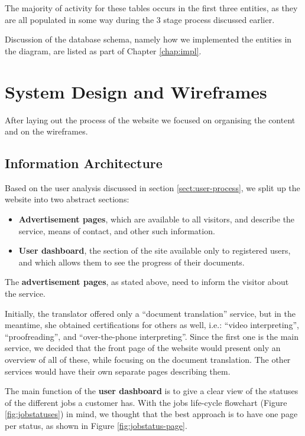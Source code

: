 \documentclass{l3proj}
\begin{document}
The majority of activity for these tables occurs in the first three entities, as
they are all populated 
in some way during the 3 stage process discussed earlier.

Discussion of the database schema, namely how we implemented the entities in the
diagram, are listed as part of Chapter \ref{chap:impl}.


\section{System Design and Wireframes}
\label{sect:system-design-and-wireframes}
After laying out the process of the website we focused on organising the content
and on the wireframes.


\subsection{Information Architecture}
Based on the user analysis discussed in section \ref{sect:user-process}, we split
up the website into two abstract sections: 
\begin{itemize} 
	\item \textbf{Advertisement pages}, which are available to all visitors, and
	describe the service, means of contact, and other such information.
	\item \textbf{User dashboard}, the section of the site available only to
	registered users, and which allows them to see the progress of their 
	documents.
\end{itemize}

The \textbf{advertisement pages}, as stated above, need to inform the visitor
about the service. 

Initially, the translator offered only a ``document translation'' service, but
in the meantime, she obtained certifications for others as well, i.e.:
``video interpreting'', ``proofreading'', and ``over-the-phone interpreting''.
Since the first one is the main service, we decided that the front page of the
website would present only an overview of all of these, while focusing on the
document translation. The other services would have their own separate pages
describing them.

The main function of the \textbf{user dashboard} is to give a clear view of
the statuses of the different jobs a customer has. With the jobs life-cycle
flowchart (Figure \ref{fig:jobstatuses}) in mind, we thought that the best
approach is to have one page per status, as shown in Figure 
\ref{fig:jobstatus-page}.
\end{document}
